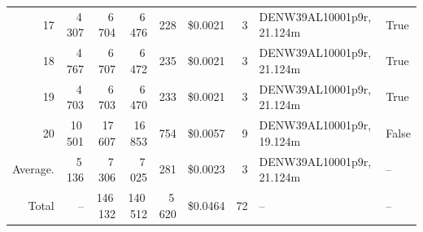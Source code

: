 \documentclass[a4paper,11pt]{article}
\begin{document}
\begin{table}[ht]
\begin{tabular}{r r r r r r r p{3cm} l}
17 & 4\,307 & 6\,704 & 6\,476 & 228 & \$0.0021 & 3 & DENW39AL10001p9r, 21.124m & True \\
18 & 4\,767 & 6\,707 & 6\,472 & 235 & \$0.0021 & 3 & DENW39AL10001p9r, 21.124m & True \\
19 & 4\,703 & 6\,703 & 6\,470 & 233 & \$0.0021 & 3 & DENW39AL10001p9r, 21.124m & True \\
20 & 10\,501 & 17\,607 & 16\,853 & 754 & \$0.0057 & 9 & DENW39AL10001p9r, 19.124m & False \\
\hline
Average. & 5\,136 & 7\,306 & 7\,025 & 281 & \$0.0023 & 3 & DENW39AL10001p9r, 21.124m & -- \\
Total & -- & 146\,132 & 140\,512 & 5\,620 & \$0.0464 & 72 & -- & -- \\
\hline
\end{tabular}
\end{table}

\clearpage
\end{document}
